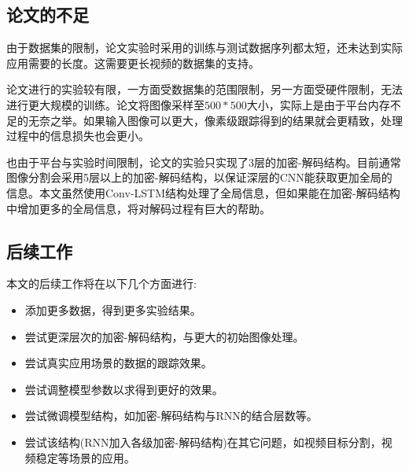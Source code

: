 \subsection{论文的不足}
由于数据集的限制，论文实验时采用的训练与测试数据序列都太短，还未达到实际应用需要的长度。这需要更长视频的数据集的支持。
\par
论文进行的实验较有限，一方面受数据集的范围限制，另一方面受硬件限制，无法进行更大规模的训练。论文将图像采样至$500*500$大小，实际上是由于平台内存不足的无奈之举。如果输入图像可以更大，像素级跟踪得到的结果就会更精致，处理过程中的信息损失也会更小。
\par
也由于平台与实验时间限制，论文的实验只实现了3层的加密-解码结构。目前通常图像分割会采用5层以上的加密-解码结构，以保证深层的CNN能获取更加全局的信息。本文虽然使用Conv-LSTM结构处理了全局信息，但如果能在加密-解码结构中增加更多的全局信息，将对解码过程有巨大的帮助。
\subsection{后续工作}
本文的后续工作将在以下几个方面进行:
\begin{itemize}
    \item 添加更多数据，得到更多实验结果。
    \item 尝试更深层次的加密-解码结构，与更大的初始图像处理。
    \item 尝试真实应用场景的数据的跟踪效果。
    \item 尝试调整模型参数以求得到更好的效果。
    \item 尝试微调模型结构，如加密-解码结构与RNN的结合层数等。
    \item 尝试该结构(RNN加入各级加密-解码结构)在其它问题，如视频目标分割，视频稳定\supercite{benchme}等场景的应用。
\end{itemize}

